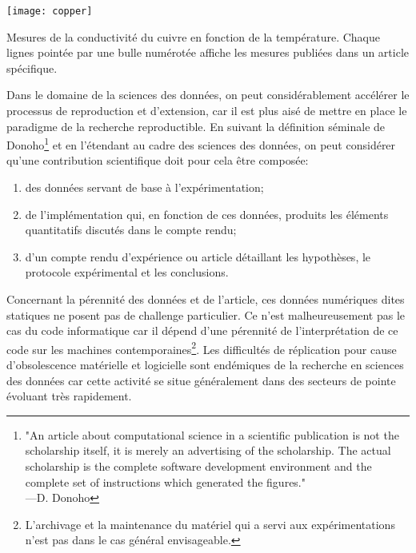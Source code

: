 \begin{marginfigure}
  \texttt{[image: copper]}
  \caption{Mesures de la conductivité du cuivre en fonction de la température. Chaque lignes pointée par une bulle numérotée affiche les mesures publiées dans un article spécifique.}
  \label{fig:copper}
\end{marginfigure}

Dans le domaine de la sciences des données, on peut considérablement accélérer le processus de reproduction et d'extension, car il est plus aisé de mettre en place le paradigme de la recherche reproductible. En suivant la définition séminale de Donoho\footnote{"An article about computational science in a scientific publication is not the scholarship itself, it is merely an advertising of the scholarship. The actual scholarship is the complete software development environment and the complete set of instructions which generated the figures." \\—D. Donoho} et en l'étendant au cadre des sciences des données, on peut considérer qu'une contribution scientifique doit pour cela être composée:
\begin{enumerate}
  \item des données servant de base à l'expérimentation;
  \item de l'implémentation qui, en fonction de ces données, produits les éléments quantitatifs discutés dans le compte rendu;
  \item d'un compte rendu d'expérience ou article détaillant les hypothèses, le protocole expérimental et les conclusions.
\end{enumerate}

Concernant la pérennité des données et de l'article, ces données numériques dites \og statiques \fg ne posent pas de challenge particulier. Ce n'est malheureusement pas le cas du code informatique car il dépend d'une pérennité de l'interprétation de ce code sur les machines contemporaines\footnote{L'archivage et la maintenance du matériel qui a servi aux expérimentations n'est pas dans le cas général envisageable.}. Les difficultés de réplication pour cause d'obsolescence matérielle et logicielle sont endémiques de la recherche en sciences des données car cette activité se situe généralement dans des secteurs de pointe évoluant très rapidement.

